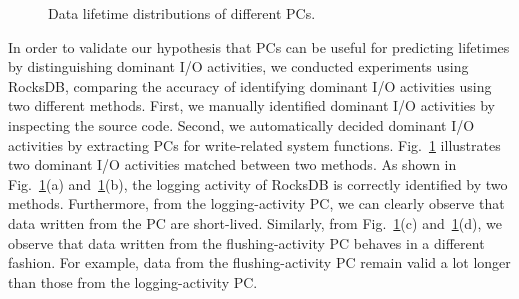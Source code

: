 \begin{figure}[b]
\centering
\vspace{-27pt}
\hfill
	\hspace{2pt}
\hfill
\vspace{-1pt}
	\hspace{2pt}
\vspace{-10pt}
\caption{Data lifetime distributions of different PCs.} 
\label{fig:types_and_PCs}
\end{figure}


In order to validate our hypothesis that PCs can be useful for predicting
lifetimes by distinguishing dominant I/O activities, we conducted experiments
using RocksDB, comparing the accuracy of identifying dominant I/O activities
using two different methods.  First, we manually identified dominant I/O
activities by inspecting the source code. Second, we automatically decided
dominant I/O activities by extracting PCs for write-related system functions.
Fig.~\ref{fig:types_and_PCs} illustrates two dominant I/O activities matched
between two methods.   As shown in Fig.~\ref{fig:types_and_PCs}(a)
and~\ref{fig:types_and_PCs}(b), the logging activity of RocksDB is correctly
identified by two methods.  Furthermore, from the logging-activity PC, we can
clearly observe that data written from the PC are short-lived. Similarly,
from Fig.~\ref{fig:types_and_PCs}(c) and~\ref{fig:types_and_PCs}(d), we observe
that data written from the flushing-activity PC behaves in a different fashion.
For example, data from the flushing-activity PC remain valid a lot longer than
those from the logging-activity PC.


